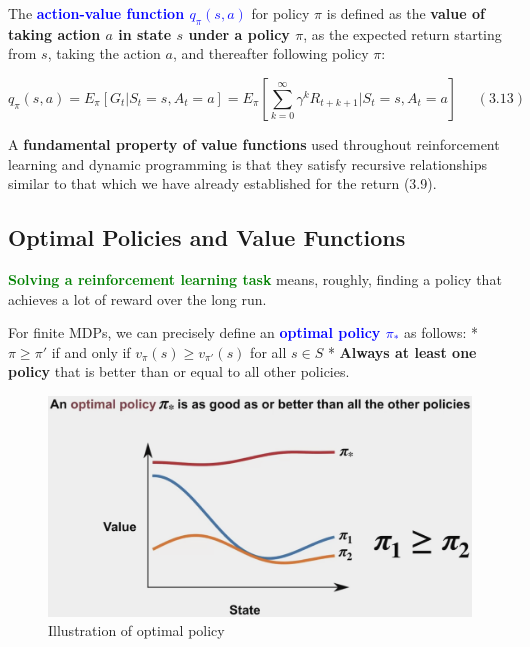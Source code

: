 \documentclass[12pt, a4paper]{article}
\begin{document}
The \textcolor{blue}{\textbf{action-value function \(q_\pi(s, a)\)}} for policy \(\pi\) is
defined as the \textbf{value of taking action \(a\) in state \(s\) under
a policy \(\pi\)}, as the expected return starting from \(s\), taking
the action \(a\), and thereafter following policy \(\pi\):

\[q_\pi(s, a) = E_\pi[G_t|S_t=s, A_t=a] = E_\pi[\sum_{k=0}^{\infty} \gamma^k R_{t+k+1} | S_t = s, A_t = a] \;\;\;\;\;(3.13)\]

A \textbf{fundamental property of value functions} used throughout
reinforcement learning and dynamic programming is that they satisfy
recursive relationships similar to that which we have already
established for the return (3.9).








\subsection{Optimal Policies and Value Functions}\label{optimal-policies-and-value-functions}

\textcolor{Green}{\textbf{Solving a reinforcement learning task}} means, roughly, finding a policy that achieves a lot of reward over the long run.

For finite MDPs, we can precisely define an \textcolor{blue}{\textbf{optimal policy \(\pi_*\)}} as follows: * \(\pi \geq \pi'\) if and only if
\(v_\pi(s) \geq v_{\pi'}(s)\) for all \(s \in S\) * \textbf{Always at
least one policy} that is better than or equal to all other policies.


\begin{figure}[H]
  \centering  %
    \includegraphics[width=0.8\columnwidth]{images/optimal-policy-eg.png}
    \caption{Illustration of optimal policy}
    \label{fig:optimal-policy-eg}
\end{figure}
\end{document}
